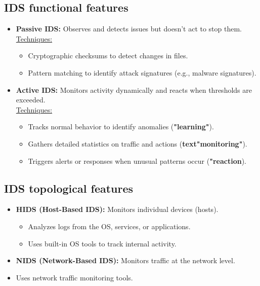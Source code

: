 \subsection{IDS functional features}
\begin{itemize}
    \item \textbf{Passive IDS:} Observes and detects issues but doesn’t act to stop them.\\ \underline{Techniques:}
    \begin{itemize}
        \item Cryptographic checksums to detect changes in files.
        \item Pattern matching to identify attack signatures (e.g., malware signatures).
    \end{itemize}
    \item \textbf{Active IDS:} Monitors activity dynamically and reacts when thresholds are exceeded.\\ \underline{Techniques:}
    \begin{itemize}
        \item Tracks normal behavior to identify anomalies (\textbf{"learning"}).
        \item Gathers detailed statistics on traffic and actions (\textbf{text"monitoring"}).
        \item Triggers alerts or responses when unusual patterns occur (\textbf{"reaction}).
    \end{itemize}
\end{itemize}

\subsection{IDS topological features}
\begin{itemize}
    \item \textbf{HIDS (Host-Based IDS):} Monitors individual devices (hosts).
    \begin{itemize}
        \item Analyzes logs from the OS, services, or applications.
        \item Uses built-in OS tools to track internal activity.
    \end{itemize}
    \item \textbf{NIDS (Network-Based IDS):} Monitors traffic at the network level.
    \item Uses network traffic monitoring tools.
\end{itemize}

